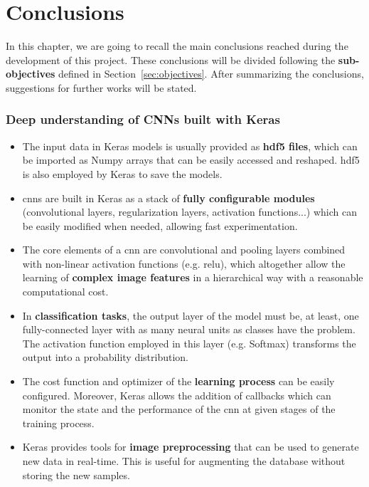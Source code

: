 \chapter{Conclusions}\label{ch:conclusions}
In this chapter, we are going to recall the main conclusions reached during the development of this project. These conclusions will be divided following the \textbf{sub-objectives} defined in Section~\ref{sec:objectives}. After summarizing the conclusions, suggestions for further works will be stated.

\subsection*{Deep understanding of CNNs built with Keras}
\begin{itemize}
	\item The input data in Keras models is usually provided as \textbf{\gls{hdf5} files}, which can be imported as Numpy arrays that can be easily accessed and reshaped. \gls{hdf5} is also employed by Keras to save the models.
	\item \glspl{cnn} are built in Keras as a stack of \textbf{fully configurable modules} (convolutional layers, regularization layers, activation functions...) which can be easily modified when needed, allowing fast experimentation.
	\item The core elements of a \gls{cnn} are convolutional and pooling layers combined with non-linear activation functions (e.g. \gls{relu}), which altogether allow the learning of \textbf{complex image features} in a hierarchical way with a reasonable computational cost.
	\item In \textbf{classification tasks}, the output layer of the model must be, at least, one fully-connected layer with as many neural units as classes have the problem. The activation function employed in this layer (e.g. Softmax) transforms the output into a probability distribution.
	\item The cost function and optimizer of the \textbf{learning process} can be easily configured. Moreover, Keras allows the addition of callbacks which can monitor the state and the performance of the \gls{cnn} at given stages of the training process.
	\item Keras provides tools for \textbf{image preprocessing} that can be used to generate new data in real-time. This is useful for augmenting the database without storing the new samples.
\end{itemize}

